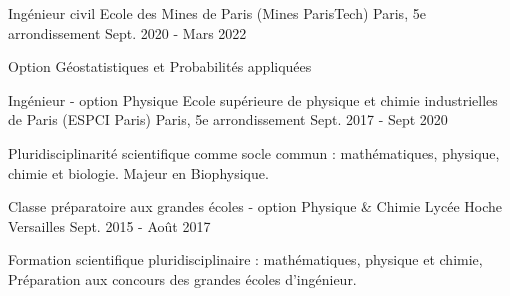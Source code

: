 

\begin{cventries}

  \cventry
    {Ingénieur civil} %
    {Ecole des Mines de Paris (Mines ParisTech)} %
    {Paris, 5e arrondissement} %
    {Sept. 2020 - Mars 2022} %
    {
        \begin{cvitems}
          \item{Option Géostatistiques et Probabilités appliquées}
        \end{cvitems}
    }
    
  \cventry
    {Ingénieur - option Physique} %
    {Ecole supérieure de physique et chimie industrielles de Paris (ESPCI Paris)} %
    {Paris, 5e arrondissement} %
    {Sept. 2017 - Sept 2020} %
    {
        \begin{cvitems}
          \item{Pluridisciplinarité scientifique comme socle commun : mathématiques, physique, chimie et biologie. Majeur en Biophysique.}
        \end{cvitems}
    }
    
  \cventry
    {Classe préparatoire aux grandes écoles - option Physique \& Chimie} %
    {Lycée Hoche} %
    {Versailles} %
    {Sept. 2015 - Août 2017}
    { \begin{cvitems}
        \item {Formation scientifique pluridisciplinaire : mathématiques, physique et chimie, Préparation aux concours des grandes écoles d'ingénieur.}
        \end{cvitems}
    }

\end{cventries}

